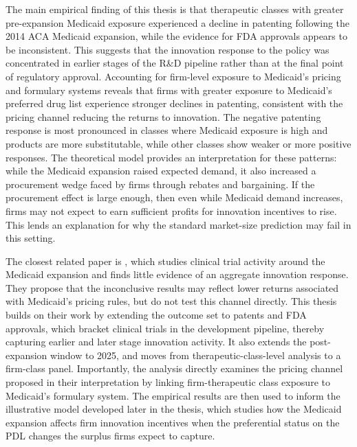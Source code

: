 \documentclass[12pt]{article}
\begin{document}
The main empirical finding of this thesis is that therapeutic classes with greater pre-expansion Medicaid exposure experienced a decline in patenting following the 2014 ACA Medicaid expansion, while the evidence for FDA approvals appears to be inconsistent. This suggests that the innovation response to the policy was concentrated in earlier stages of the R\&D pipeline rather than at the final point of regulatory approval. Accounting for firm-level exposure to Medicaid's pricing and formulary systems reveals that firms with greater exposure to Medicaid's preferred drug list experience stronger declines in patenting, consistent with the pricing channel reducing the returns to innovation. The negative patenting response is most pronounced in classes where Medicaid exposure is high and products are more substitutable, while other classes show weaker or more positive responses. The theoretical model provides an interpretation for these patterns: while the Medicaid expansion raised expected demand, it also increased a procurement wedge faced by firms through rebates and bargaining. If the procurement effect is large enough, then even while Medicaid demand increases, firms may not expect to earn sufficient profits for innovation incentives to rise. This lends an explanation for why the standard market-size prediction may fail in this setting.

The closest related paper is \citet{NBERw28755}, which studies clinical trial activity around the Medicaid expansion and finds little evidence of an aggregate innovation response. They propose that the inconclusive results may reflect lower returns associated with Medicaid's pricing rules, but do not test this channel directly. This thesis builds on their work by extending the outcome set to patents and FDA approvals, which bracket clinical trials in the development pipeline, thereby capturing earlier and later stage innovation activity. It also extends the post-expansion window to 2025, and moves from therapeutic-class-level analysis to a firm-class panel. Importantly, the analysis directly examines the pricing channel proposed in their interpretation by linking firm-therapeutic class exposure to Medicaid's formulary system. The empirical results are then used to inform the illustrative model developed later in the thesis, which studies how the Medicaid expansion affects firm innovation incentives when the preferential status on the PDL changes the surplus firms expect to capture.
\end{document}
